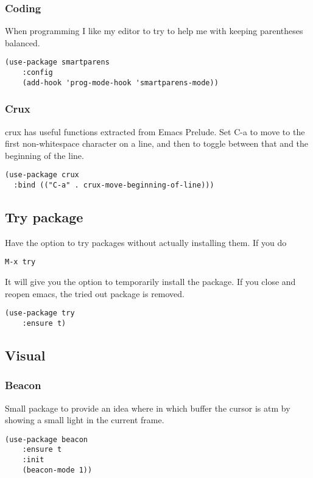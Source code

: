 \documentclass[11pt]{article}
\begin{document}
\subsubsection{Coding}
\label{sec:orgcb6762e}
When programming I like my editor to try to help me with keeping parentheses balanced.
\begin{verbatim}
(use-package smartparens
    :config
    (add-hook 'prog-mode-hook 'smartparens-mode))
\end{verbatim}

\subsubsection{Crux}
\label{sec:orge6c63f6}
crux has useful functions extracted from Emacs Prelude. Set C-a to move to the first non-whitespace character on a line, and then to toggle between that and the beginning of the line.
\begin{verbatim}
(use-package crux
  :bind (("C-a" . crux-move-beginning-of-line)))
\end{verbatim}
\subsection{Try package}
\label{sec:org299be50}
Have the option to try packages without actually installing them. If you do

\begin{verbatim}
M-x try
\end{verbatim}

It will give you the option to temporarily install the package. If you close and reopen emacs, the tried out package is removed.

\begin{verbatim}
(use-package try
    :ensure t)
\end{verbatim}
\subsection{Visual}
\label{sec:orgfc63ab4}
\subsubsection{Beacon}
\label{sec:org78d77ba}
Small package to provide an idea where in which buffer the cursor is atm by showing a small light in the current frame.
\begin{verbatim}
(use-package beacon
    :ensure t
    :init
    (beacon-mode 1))
\end{verbatim}
\end{document}
